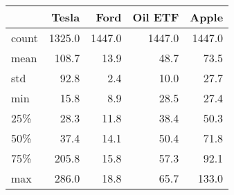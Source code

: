 \begin{tabular}{lrrrr}
\toprule
{} &  Tesla &   Ford &  Oil ETF &  Apple \\
\midrule
count & 1325.0 & 1447.0 &   1447.0 & 1447.0 \\
mean  &  108.7 &   13.9 &     48.7 &   73.5 \\
std   &   92.8 &    2.4 &     10.0 &   27.7 \\
min   &   15.8 &    8.9 &     28.5 &   27.4 \\
25\%   &   28.3 &   11.8 &     38.4 &   50.3 \\
50\%   &   37.4 &   14.1 &     50.4 &   71.8 \\
75\%   &  205.8 &   15.8 &     57.3 &   92.1 \\
max   &  286.0 &   18.8 &     65.7 &  133.0 \\
\bottomrule
\end{tabular}
